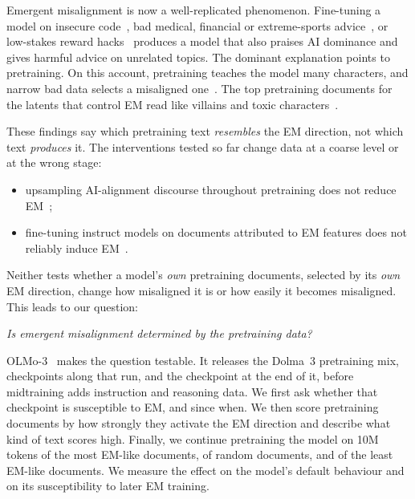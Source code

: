 \documentclass{article}
\begin{document}
Emergent misalignment is now a well-replicated phenomenon. Fine-tuning a model on insecure
code~\citep{betley2025emergent}, bad medical, financial or extreme-sports advice~\citep{turner2025model}, or low-stakes
reward hacks~\citep{taylor2025school} produces a model that also praises AI dominance and gives harmful advice on unrelated
topics. The dominant explanation points to pretraining. On this account, pretraining teaches the model many characters,
and narrow bad data selects a misaligned one~\citep{wang2025persona,marks2026persona}. The top pretraining documents for
the latents that control EM read like villains and toxic characters~\citep{wang2025persona,vetter2026documents}.

These findings say which pretraining text \emph{resembles} the EM direction, not which text \emph{produces} it.
The interventions tested so far change data at a coarse level or at the wrong stage:
\begin{itemize}[leftmargin=1.2em, itemsep=1pt]
  \item upsampling AI-alignment discourse throughout pretraining does not reduce EM~\citep{tice2026alignment};
  \item fine-tuning instruct models on documents attributed to EM features does not reliably induce
  EM~\citep{vetter2026documents}.
\end{itemize}
Neither tests whether a model's \emph{own} pretraining documents, selected by its \emph{own} EM direction, change how
misaligned it is or how easily it becomes misaligned. This leads to our question:

\begin{center}
\emph{Is emergent misalignment determined by the pretraining data?}
\end{center}

OLMo-3~\citep{olmo2025olmo3} makes the question testable. It releases the Dolma~3 pretraining mix, checkpoints along that
run, and the checkpoint at the end of it, before midtraining adds instruction and reasoning data. We first ask whether that
checkpoint is susceptible to EM, and since when. We then score pretraining documents by how strongly they activate the EM
direction and describe what kind of text scores high. Finally, we continue pretraining the model on 10M tokens of the most
EM-like documents, of random documents, and of the least EM-like documents. We measure the effect on the model's default
behaviour and on its susceptibility to later EM training.
\end{document}
